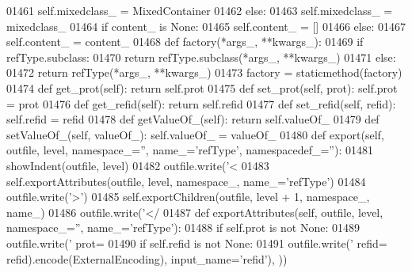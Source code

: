 \begin{DoxyCode}
{{{{{{{{{{{{{{{{{{{{{{{{{{{{{{{{{{{{{{{{{{{{{{{{{{{{{{{{{{{{{{{{{{{{{{{{{{{{{{{{{{{{{{{{01461             self.mixedclass_ = MixedContainer
01462         \textcolor{keywordflow}{else}:
01463             self.mixedclass_ = mixedclass\_
01464         \textcolor{keywordflow}{if} content\_ \textcolor{keywordflow}{is} \textcolor{keywordtype}{None}:
01465             self.content_ = []
01466         \textcolor{keywordflow}{else}:
01467             self.content_ = content\_
01468     \textcolor{keyword}{def }factory(*args\_, **kwargs\_):
01469         \textcolor{keywordflow}{if} refType.subclass:
01470             \textcolor{keywordflow}{return} refType.subclass(*args\_, **kwargs\_)
01471         \textcolor{keywordflow}{else}:
01472             \textcolor{keywordflow}{return} refType(*args\_, **kwargs\_)
01473     factory = staticmethod(factory)
01474     \textcolor{keyword}{def }get_prot(self): \textcolor{keywordflow}{return} self.prot
01475     \textcolor{keyword}{def }set_prot(self, prot): self.prot = prot
01476     \textcolor{keyword}{def }get_refid(self): \textcolor{keywordflow}{return} self.refid
01477     \textcolor{keyword}{def }set_refid(self, refid): self.refid = refid
01478     \textcolor{keyword}{def }getValueOf_(self): \textcolor{keywordflow}{return} self.valueOf\_
01479     \textcolor{keyword}{def }setValueOf_(self, valueOf\_): self.valueOf\_ = valueOf\_
01480     \textcolor{keyword}{def }export(self, outfile, level, namespace\_='', name\_='refType', namespacedef\_=''):
01481         showIndent(outfile, level)
01482         outfile.write(\textcolor{stringliteral}{'<%
01483         self.exportAttributes(outfile, level, namespace\_, name\_=\textcolor{stringliteral}{'refType'})
01484         outfile.write(\textcolor{stringliteral}{'>'})
01485         self.exportChildren(outfile, level + 1, namespace\_, name\_)
01486         outfile.write(\textcolor{stringliteral}{'</%
01487     \textcolor{keyword}{def }exportAttributes(self, outfile, level, namespace\_='', name\_='refType'):
01488         \textcolor{keywordflow}{if} self.prot \textcolor{keywordflow}{is} \textcolor{keywordflow}{not} \textcolor{keywordtype}{None}:
01489             outfile.write(\textcolor{stringliteral}{' prot=%
01490         \textcolor{keywordflow}{if} self.refid \textcolor{keywordflow}{is} \textcolor{keywordflow}{not} \textcolor{keywordtype}{None}:
01491             outfile.write(\textcolor{stringliteral}{' refid=%
      refid).encode(ExternalEncoding), input\_name=\textcolor{stringliteral}{'refid'}), ))
}}}}}}}}}}}}}}}}}}}}}}}}}}}}}}}}}}}}}}}}}}}}}}}}}}}}}}}}}}}}}}}}}}}}}}}}}}}}}}}}}}}}}}}}}}}}
\end{DoxyCode}
